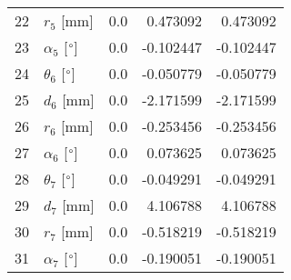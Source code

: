 \documentclass{standalone}%
\begin{document}
\begin{tabular}{llrrr}
22 &              $r_{5}$ [mm] &       0.0 &   0.473092 &   0.473092 \\
23 &  $\alpha_{5}$ [$\degree$] &       0.0 &  -0.102447 &  -0.102447 \\
24 &  $\theta_{6}$ [$\degree$] &       0.0 &  -0.050779 &  -0.050779 \\
25 &              $d_{6}$ [mm] &       0.0 &  -2.171599 &  -2.171599 \\
26 &              $r_{6}$ [mm] &       0.0 &  -0.253456 &  -0.253456 \\
27 &  $\alpha_{6}$ [$\degree$] &       0.0 &   0.073625 &   0.073625 \\
28 &  $\theta_{7}$ [$\degree$] &       0.0 &  -0.049291 &  -0.049291 \\
29 &              $d_{7}$ [mm] &       0.0 &   4.106788 &   4.106788 \\
30 &              $r_{7}$ [mm] &       0.0 &  -0.518219 &  -0.518219 \\
31 &  $\alpha_{7}$ [$\degree$] &       0.0 &  -0.190051 &  -0.190051 \\
\bottomrule
\end{tabular}
%
\end{document}
